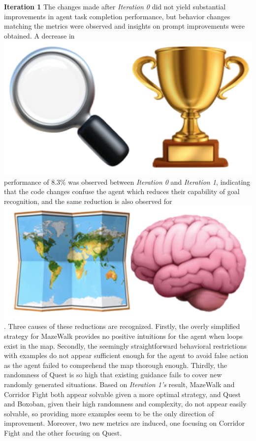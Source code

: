 \begin{flushleft}
	\textbf{Iteration 1} The changes made after \emph{Iteration 0} did not yield
	substantial improvements in agent task completion performance, but behavior changes
	matching the metrics were observed and insights on prompt improvements were obtained.
	A decrease in
	\includegraphics[scale=0.05]{figs/emojis/mini_1.png}
	performance of 8.3\% was observed between \emph{Iteration 0} and \emph{Iteration
	1}, indicating that the code changes confuse the agent which reduces their
	capability of goal recognition, and the same reduction is also observed for
	\includegraphics[scale=0.05]{figs/emojis/mini_2.png}
	. Three causes of these reductions are recognized. Firstly, the overly simplified
	strategy for MazeWalk provides no positive intuitions for the agent when loops
	exist in the map. Secondly, the seemingly straightforward behavioral restrictions
	with examples do not appear sufficient enough for the agent to avoid false action
	as the agent failed to comprehend the map thorough enough. Thirdly, the randomness
	of Quest is so high that existing guidance fails to cover new randomly generated
	situations. Based on \emph{Iteration 1's} result, MazeWalk and Corridor Fight
	both appear solvable given a more optimal strategy, and Quest and Boxoban,
	given their high randomness and complexity, do not appear easily solvable, so
	providing more examples seem to be the only direction of improvement. Moreover,
	two new metrics are induced, one focusing on Corridor Fight and the other focusing
	on Quest.


\end{flushleft}
